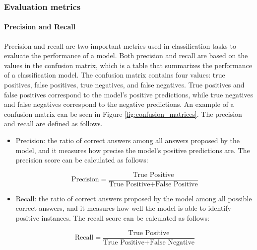          


        \subsubsection{Evaluation metrics}

        \paragraph{Precision and Recall\\}
        Precision and recall are two important metrics used in classification tasks to evaluate the performance of a model. 
        Both precision and recall are based on the values in the confusion matrix, which is a table that summarizes the performance of a classification model. The confusion matrix contains four values: true positives, false positives, true negatives, and false negatives. True positives and false positives correspond to the model's positive predictions, while true negatives and false negatives correspond to the negative predictions. An example of a confusion matrix can be seen in Figure \ref{fig:confusion_matrices}. The precision and recall are defined as follows.
        

        \begin{itemize}
            \item Precision: the ratio of correct answers among all answers proposed by the model, and it measures how precise the model's positive predictions are. The precision score can be calculated as follows:
            
            \begin{equation}
                \text{Precision} = \frac{\text{True Positive}}{\text{True Positive} + \text{False Positive}}
            \end{equation}
            
            \item Recall: the ratio of correct answers proposed by the model among all possible correct answers, and it measures how well the model is able to identify positive instances. The recall score can be calculated as follows:

            \begin{equation}
                \text{Recall} = \frac{\text{True Positive}}{\text{True Positive} + \text{False Negative}}
            \end{equation}
        \end{itemize}


